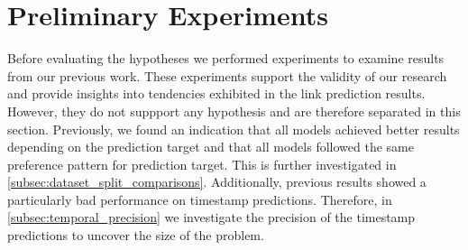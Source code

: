 \section{Preliminary Experiments}
\label{sec:preliminary_experiments}

Before evaluating the hypotheses we performed experiments to examine results from our previous work. These experiments support the validity of our research and provide insights into tendencies exhibited in the link prediction results. However, they do not suppport any hypothesis and are therefore separated in this section.
Previously, we found an indication that all models achieved better results depending on the prediction target and that all models followed the same preference pattern for prediction target. This is further investigated in \autoref{subsec:dataset_split_comparisons}.
Additionally, previous results showed a particularly bad performance on timestamp predictions. Therefore, in \autoref{subsec:temporal_precision} we investigate the precision of the timestamp predictions to uncover the size of the problem.


